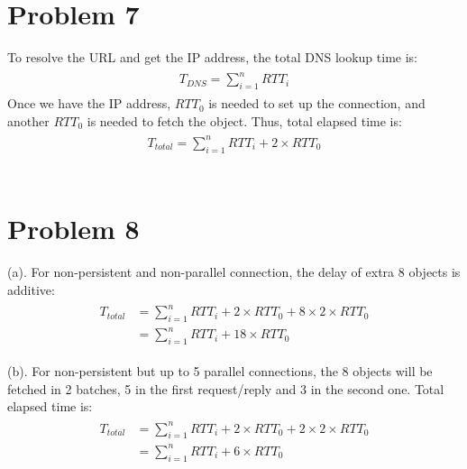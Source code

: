 \documentclass[titlepage, paper=a4, fontsize=11pt]{scrartcl} %
\numberwithin{equation}{section} %
\numberwithin{figure}{section} %
\numberwithin{table}{section} %
\begin{document}

\section*{Problem 7}
To resolve the URL and get the IP address, the total DNS lookup time is:
\begin{align*} 
\begin{split}
T_{DNS} = \sum\limits_{i=1}^n RTT_{i} 
\end{split}					
\end{align*}
Once we have the IP address, $RTT_{0}$ is needed to set up the connection,
and another $RTT_{0}$ is needed to fetch the object. Thus, total elapsed time is:
\begin{align*} 
\begin{split}
T_{total} = \sum\limits_{i=1}^n RTT_{i} + 2 \times RTT_{0}
\end{split}					
\end{align*}
\\



\section*{Problem 8}
(a). For non-persistent and non-parallel connection, the delay of extra 8 objects is additive:
\begin{align*} 
\begin{split}
T_{total} &= \sum\limits_{i=1}^n RTT_{i} + 2 \times RTT_{0} + 8 \times 2 \times RTT_{0} \\
&= \sum\limits_{i=1}^n RTT_{i} + 18 \times RTT_{0}
\end{split}					
\end{align*}

(b). For non-persistent but up to 5 parallel connections, the 8 objects will be fetched in 2 batches,
5 in the first request/reply and 3 in the second one. Total elapsed time is:
\begin{align*} 
\begin{split}
T_{total} &= \sum\limits_{i=1}^n RTT_{i} + 2 \times RTT_{0} + 2 \times 2 \times RTT_{0} \\
&= \sum\limits_{i=1}^n RTT_{i} + 6 \times RTT_{0}
\end{split}					
\end{align*}
\end{document}
